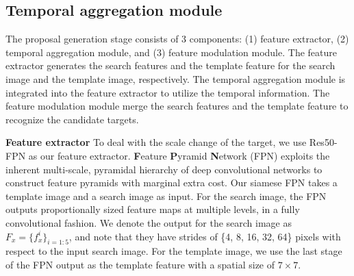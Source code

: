 \subsection{Temporal aggregation module}
\label{sec:stage1}
The proposal generation stage consists of 3 components: (1) feature extractor, (2) temporal aggregation module, and (3) feature modulation module.
The feature extractor generates the search features and the template feature for the search image and the template image, respectively. The temporal aggregation module is integrated into the feature extractor to utilize the temporal information. The feature modulation module merge the search features and the template feature to recognize the candidate targets.

\textbf{Feature extractor} To deal with the scale change of the target, we use Res50-FPN \cite{lin2017feature} as our feature extractor.
\textbf{F}eature \textbf{P}yramid \textbf{N}etwork (FPN) exploits the inherent multi-scale,  pyramidal hierarchy of deep convolutional networks to construct feature pyramids with marginal extra cost. 
Our siamese FPN takes a template image and a search image as input. For the search image, the FPN outputs proportionally sized feature maps at multiple levels, in a fully convolutional fashion.
We denote the output for the search image as $F_{x} = \{f_{x}^i\}_{i=1:5}$, and note that they have strides of \{4, 8, 16, 32, 64\} pixels with respect to the input search image.
For the template image, we use the last stage of the FPN output as the template feature with a spatial size of $7 \times 7$.

